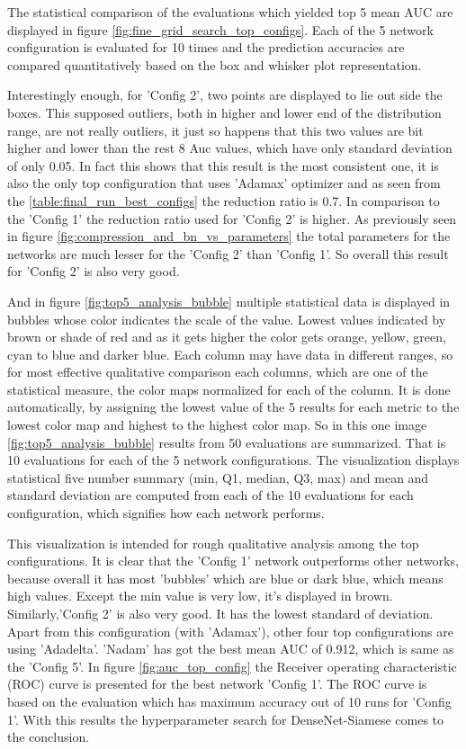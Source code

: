 The statistical comparison of the evaluations which yielded top 5 mean AUC are displayed in figure \ref{fig:fine_grid_search_top_configs}. Each of the 5 network configuration is evaluated for 10 times and the prediction accuracies 
are compared quantitatively based on the box and whisker plot representation.

Interestingly enough, for 'Config 2', two points are displayed to lie out side the boxes. This supposed outliers, both in higher and lower end of the distribution range, are not really outliers, it just so happens that this 
two values are bit higher and lower than the rest 8 Auc values, which have only standard deviation of only 0.05. In fact this shows that this result is the most consistent one, it is also the only top configuration that uses 'Adamax' 
optimizer and as seen from the \ref{table:final_run_best_configs} the reduction ratio is 0.7. In comparison to the 'Config 1' the reduction ratio used for 'Config 2' is higher. As previously seen in figure 
\ref{fig:compression_and_bn_vs_parameters} the total parameters for the networks are much lesser for the 'Config 2' than 'Config 1'. So overall this result for 'Config 2' is also very good.


And in figure \ref{fig:top5_analysis_bubble} multiple statistical data is displayed in bubbles 
whose color indicates the scale of the value. Lowest values indicated by brown or shade of red and as it gets higher the color gets orange, yellow, green, cyan to blue and darker blue. Each column may have data in different ranges, 
so for most effective qualitative comparison each columns, which are one of the statistical measure, the color maps normalized for each of the column. It is done automatically, by assigning the lowest value of the 5 results for each metric
to the lowest color map and highest to the highest color map. So in this one image \ref{fig:top5_analysis_bubble} results from 50 evaluations are summarized. That is 10 evaluations for each of the 5 network configurations. 
The visualization displays statistical five number summary (min, Q1, median, Q3, max) and mean and standard deviation are computed from each of the 10 evaluations for each configuration, which signifies how each network performs. 

This visualization is intended for rough qualitative analysis among the top configurations. It is clear that the 'Config 1' network outperforms other networks, because overall it has most 'bubbles' which are blue or dark blue,
which means high values. Except the min value is very low, it's displayed in brown. Similarly,'Config 2' is also very good. 
It has the lowest standard of deviation. Apart from this configuration (with 'Adamax'), other four top configurations are using 'Adadelta'. 'Nadam' has got the best mean AUC of 0.912, which is same as the 'Config 5'. 
In figure \ref{fig:auc_top_config} the Receiver operating characteristic (ROC) curve is presented for the best network 'Config 1'. The ROC curve is based on the evaluation which has maximum accuracy out of 10 runs for 'Config 1'.
With this results the hyperparameter search for DenseNet-Siamese comes to the conclusion.

